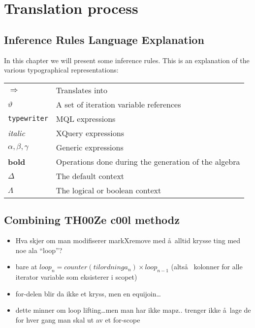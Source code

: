 \chapter{Translation process}

\section{Inference Rules Language Explanation}
\label{sect:translation:inferenceExplanation}
In this chapter we will present some inference rules. This is an explanation of
the various typographical representations:

\begin{tabular}{l|l}

  $\Longrightarrow$  & Translates into \\
  $\vartheta$ & A set of iteration variable references \\
  \texttt{typewriter} & MQL expressions \\
  \textit{italic} & XQuery expressions \\
  $\alpha , \beta, \gamma$ & Generic expressions \\
  \textbf{bold} & Operations done during the generation of the algebra \\
  $\Delta$ & The default context \\
  $\Lambda$ & The logical or boolean context \\
  
\end{tabular}








\section{Combining TH00Ze c00l methodz}
\begin{itemize}
  \item Hva skjer om man modifiserer markXremove med \aa~alltid krysse ting med
  noe ala ``loop''?
  \item bare at $loop_{n} = counter(tilordninga_{n}) \times loop_{n-1}$
  (alts\aa~ kolonner for alle iterator variable som eksisterer i scopet)
  \item for-delen blir da ikke et kryss, men en equijoin\ldots
  \item dette minner om loop lifting\ldots men man har ikke mapz.. trenger ikke
  \aa~lage de for hver gang man skal ut av et for-scope
\end{itemize}
